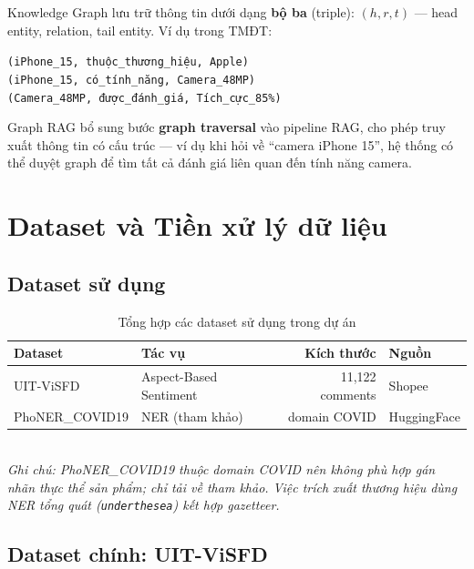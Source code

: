\documentclass[12pt,a4paper]{article}
\begin{document}
Knowledge Graph lưu trữ thông tin dưới dạng \textbf{bộ ba} (triple): $(h, r, t)$ --- head entity, relation, tail entity. Ví dụ trong TMĐT:

\begin{center}
\texttt{(iPhone\_15, thuộc\_thương\_hiệu, Apple)} \\
\texttt{(iPhone\_15, có\_tính\_năng, Camera\_48MP)} \\
\texttt{(Camera\_48MP, được\_đánh\_giá, Tích\_cực\_85\%)}
\end{center}

Graph RAG bổ sung bước \textbf{graph traversal} vào pipeline RAG, cho phép truy xuất thông tin có cấu trúc --- ví dụ khi hỏi về ``camera iPhone 15'', hệ thống có thể duyệt graph để tìm tất cả đánh giá liên quan đến tính năng camera.

\section{Dataset và Tiền xử lý dữ liệu}

\subsection{Dataset sử dụng}

\begin{table}[H]
\centering
\caption{Tổng hợp các dataset sử dụng trong dự án}
\begin{tabular}{llrl}
\toprule
\textbf{Dataset} & \textbf{Tác vụ} & \textbf{Kích thước} & \textbf{Nguồn} \\
\midrule
UIT-ViSFD & Aspect-Based Sentiment & 11,122 comments & Shopee \\
PhoNER\_COVID19 & NER (tham khảo) & domain COVID & HuggingFace \\
\bottomrule
\end{tabular}
\\[4pt]
{\small\textit{Ghi chú: PhoNER\_COVID19 thuộc domain COVID nên không phù hợp gán nhãn thực thể sản phẩm; chỉ tải về tham khảo. Việc trích xuất thương hiệu dùng NER tổng quát (\texttt{underthesea}) kết hợp gazetteer.}}
\end{table}

\subsection{Dataset chính: UIT-ViSFD}
\end{document}
